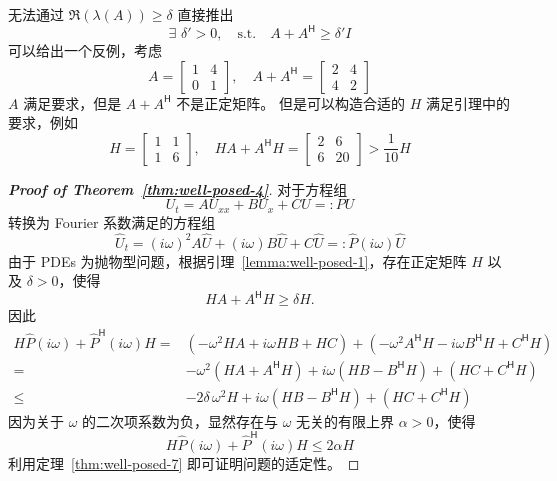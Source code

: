 \begin{remark}
    无法通过 $\Re(\lambda(A)) \ge \delta$ 直接推出
    \[
        \exists\,\,\delta' > 0,\quad \text{s.t.} \quad A + A^{\mathsf{H}} \ge \delta' I
    \]
    可以给出一个反例，考虑
    \[
        A = \begin{bmatrix}
            1 & 4 \\
            0 & 1
        \end{bmatrix},\quad  A + A^{\mathsf{H}} = \begin{bmatrix}
            2 & 4 \\
            4 & 2
        \end{bmatrix}
    \]
    $A$ 满足要求，但是 $A + A^{\mathsf{H}}$ 不是正定矩阵。
    但是可以构造合适的 $H$ 满足引理中的要求，例如
    \[
        H = \begin{bmatrix}
            1 & 1 \\
            1 & 6
        \end{bmatrix}, \quad
        H A + A^{\mathsf{H}} H = \begin{bmatrix}
            2 & 6  \\
            6 & 20
        \end{bmatrix} > \frac{1}{10} H
    \]
\end{remark}

\begin{proof}[\normalfont\bfseries Proof of Theorem~\ref{thm:well-posed-4}]
    对于方程组
    \[
        U_t = A U_{xx} + B U_x + C U =: P U
    \]
    转换为 Fourier 系数满足的方程组
    \[
        \widehat{U}_t = (i \omega)^2 A \widehat{U}  + (i \omega) B \widehat{U} + C \widehat{U}
        =: \widehat{P}(i \omega) \widehat{U}
    \]
    由于 PDEs 为抛物型问题，根据引理~\ref{lemma:well-posed-1}，存在正定矩阵 $H$ 以及 $\delta > 0$，使得
    \[
        H A + A^\mathsf{H} H \ge \delta H.
    \]
    因此
    \begin{align*}
        H \widehat{P}(i \omega) + \widehat{P}^\mathsf{H}(i \omega) H
        ={}   & \left(-\omega^2 H A + i \omega H B + H C\right)
        + \left(-\omega^2 A^\mathsf{H} H - i \omega B^\mathsf{H} H + C^\mathsf{H} H\right)                \\
        ={}   & -\omega^2 (H A + A^\mathsf{H} H) + i \omega (H B - B^\mathsf{H}H) + (HC + C^\mathsf{H} H) \\
        \le{} & - 2 \delta\, \omega^2 H + i \omega (H B - B^\mathsf{H}H) + (HC + C^\mathsf{H} H)
    \end{align*}
    因为关于 $\omega$ 的二次项系数为负，显然存在与 $\omega$ 无关的有限上界 $\alpha > 0$，使得
    \[
        H \widehat{P}(i \omega) + \widehat{P}^\mathsf{H}(i \omega) H \le 2 \alpha H
    \]
    利用定理~\ref{thm:well-posed-7} 即可证明问题的适定性。
\end{proof}


